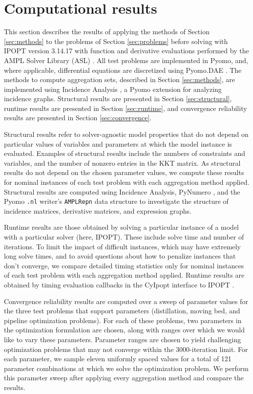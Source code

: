 \documentclass[smallextended]{svjour3}
\newcommand{\rev}[1]{{#1}}
\begin{document}
\section{Computational results}
\label{sec:results}

This section describes the results of applying the methods of Section \ref{sec:methods}
to the problems of Section \ref{sec:problems} before solving with IPOPT \cite{ipopt}
version 3.14.17 with function and derivative evaluations performed by the AMPL
Solver Library (ASL) \cite{asl}.
All test problems are implemented in Pyomo, and, where applicable, differential
equations are discretized using Pyomo.DAE \cite{pyomodae}.
The methods to compute aggregation sets, described in Section \ref{sec:methods},
are implemented using Incidence Analysis \cite{parker2023dulmage}, a Pyomo extension
for analyzing incidence graphs.
Structural results are presented in Section \ref{sec:structural},
runtime results are presented in Section \ref{sec:runtime},
and convergence reliability results are presented in Section \ref{sec:convergence}.

Structural results refer to solver-agnostic model properties that do not depend
on particular values of variables and parameters at which the model instance is evaluated.
Examples of structural results include the numbers of constraints and variables, and
the number of nonzero entries in the KKT matrix.
As structural results do not depend on the chosen parameter values, we compute
these results for nominal instances of each test problem with each
aggregation method applied.
Structural results are computed using Incidence Analysis, PyNumero \cite{pynumero},
and the Pyomo {\tt .nl} writer's {\tt AMPLRepn} data structure to investigate the
structure of incidence matrices, derivative matrices, and expression graphs.

Runtime results are those obtained by solving a particular instance of a model
with a particular solver (here, IPOPT).
\rev{These include solve time and number of iterations.}
To limit the impact of difficult instances, which may have extremely long solve times,
and to avoid questions about how to penalize instances that don't converge,
we compare detailed timing statistics only for nominal instances of each test problem
with each aggregation method applied.
Runtime results are obtained by timing evaluation callbacks in the CyIpopt interface
to IPOPT \cite{cyipopt}.

Convergence reliability results are computed over a sweep of parameter values
for the three test problems that support parameters (distillation, moving bed,
and pipeline optimization problems).
For each of these problems, two parameters in the optimization formulation
are chosen, along with ranges over which we would like to vary these parameters.
Parameter ranges are chosen to yield challenging optimization problems that may
not converge within the 3000-iteration limit.
For each parameter, we sample eleven uniformly spaced values for a total of
121 parameter combinations at which we solve the optimization problem.
We perform this parameter sweep after applying every aggregation method and compare
the results.
\end{document}

